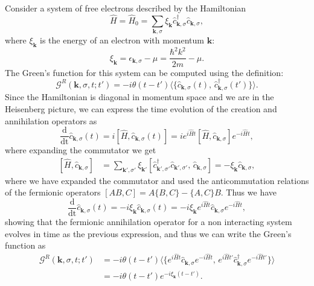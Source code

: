 \begin{example}
    Consider a system of free electrons described by the Hamiltonian
    \[
        \hat{H} = \hat{H}_0 = \sum_{\mathbf{k}, \sigma} \xi_{\mathbf{k}} \hat{c}_{\mathbf{k}, \sigma}^\dagger \hat{c}_{\mathbf{k}, \sigma},
    \]
    where \(\xi_{\mathbf{k}}\) is the energy of an electron with momentum \(\mathbf{k}\):
    \[
        \xi_{\mathbf{k}} = \epsilon_{\mathbf{k}, \sigma} - \mu = \frac{\hbar^2 k^2}{2m} - \mu.
    \]
    The Green's function for this system can be computed using the definition:
    \[
        \mathcal{G}^R(\mathbf{k}, \sigma, t; t') = -i \theta(t - t') \langle \{ \hat{c}_{\mathbf{k}, \sigma}(t),\, \hat{c}_{\mathbf{k}, \sigma}^\dagger(t') \} \rangle.
    \]
    Since the Hamiltonian is diagonal in momentum space and we are in the Heisenberg picture, we can express the time evolution of the creation and annihilation operators as
    \[
        \frac{\mathrm{d}}{\mathrm{dt}} \hat{c}_{\mathbf{k}, \sigma}(t) = i \left[ \hat{H}, \hat{c}_{\mathbf{k}, \sigma}(t) \right] = i e^{i \hat{H} t} \left[ \hat{H}, \hat{c}_{\mathbf{k}, \sigma} \right] e^{-i \hat{H} t},
    \]
    where expanding the commutator we get
    \[
        \begin{aligned}
            \left[ \hat{H}, \hat{c}_{\mathbf{k}, \sigma} \right] & = \sum_{\mathbf{k}', \sigma'} \xi_{\mathbf{k}'} \left[ \hat{c}_{\mathbf{k}', \sigma'}^\dagger \hat{c}_{\mathbf{k}', \sigma'},\, \hat{c}_{\mathbf{k}, \sigma} \right]  = -\xi_{\mathbf{k}} \hat{c}_{\mathbf{k}, \sigma},
        \end{aligned}
    \]
    where we have expanded the commutator and used the anticommutation relations of the fermionic operators \([AB,C]=A\{B,C\} - \{A,C\} B\). Thus we have
    \[
        \frac{\mathrm{d}}{\mathrm{dt}} \hat{c}_{\mathbf{k}, \sigma}(t) = -i \xi_{\mathbf{k}} \hat{c}_{\mathbf{k}, \sigma}(t) = -i \xi_{\mathbf{k}} e^{i \hat{H} t} \hat{c}_{\mathbf{k}, \sigma} e^{-i \hat{H} t},
    \]
    showing that the fermionic annihilation operator for a non interacting system evolves in time as the previous expression, and thus we can write the Green's function as
    \[
        \begin{aligned}
            \mathcal{G}^R(\mathbf{k}, \sigma, t; t') & = -i \theta(t - t') \langle \{ e^{i \hat{H} t} \hat{c}_{\mathbf{k}, \sigma} e^{-i \hat{H} t},\, e^{i \hat{H} t'} \hat{c}_{\mathbf{k}, \sigma}^\dagger e^{-i \hat{H} t'} \} \rangle \\
                                                     & = -i \theta(t - t') e^{-i \xi_{\mathbf{k}} (t - t')}.
        \end{aligned}
    \]


\end{example}

